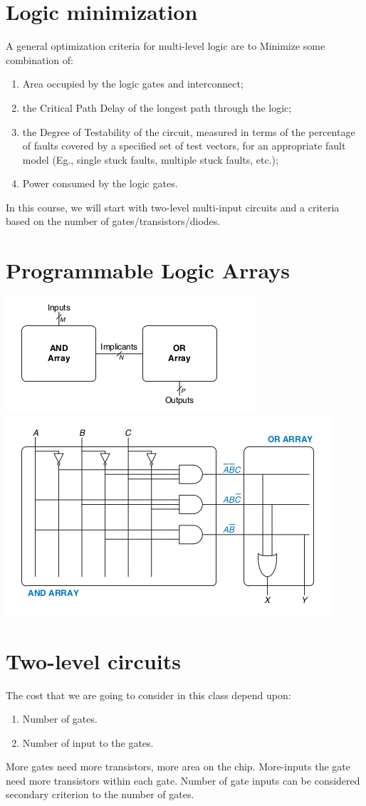 \maketitle

\section{Logic minimization}

A general optimization criteria for multi-level logic are to Minimize
some combination of:
\begin{enumerate}
\item Area occupied by the logic gates and interconnect;
\item the Critical Path Delay of the longest path through the logic;
\item the Degree of Testability of the circuit, measured in terms of the percentage
of faults covered by a specified set of test vectors, for an appropriate fault model
(Eg., single stuck faults, multiple stuck faults, etc.);
\item Power consumed by the logic gates.
\end{enumerate}

In this course, we will start with two-level multi-input circuits and a criteria
based on the number of gates/transistors/diodes.

\section{Programmable Logic Arrays}
\includegraphics[width=0.5\linewidth]{figures/PLA-abstract.png}
\includegraphics[width=0.5\linewidth]{figures/PLA-logic.png}

\section{Two-level circuits}
The cost that we are going to consider in this class depend upon:
\begin{enumerate}
\item Number of gates.
\item Number of input to the gates.
\end{enumerate}
More gates need more transistors, more area on the chip. More-inputs the gate
need more transistors within each gate. Number of gate inputs can be considered
secondary criterion to the number of gates.

